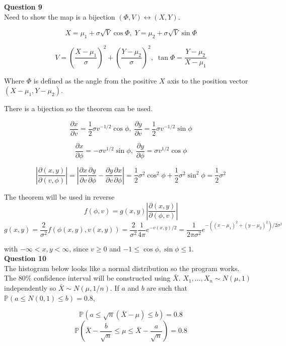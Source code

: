 \documentclass[12pt]{extarticle}
\begin{document}
\textbf{Question 9}\\

Need to show the map is a bijection $(\Phi, V) \leftrightarrow (X,Y)$.

$$X = \mu_1 + \sigma \sqrt{V}\cos{\Phi},\;Y = \mu_2 + \sigma \sqrt{V}\sin{\Phi}$$

$$V = \left(\frac{X-\mu_1}{\sigma}\right)^2+\left(\frac{Y-\mu_2}{\sigma}\right)^2,\;\tan{\Phi} = \frac{Y-\mu_2}{X-\mu_1}$$

Where $\Phi$ is defined as the angle from the positive $X$ axis to the position vector $(X-\mu_1,Y-\mu_2)$. 

There is a bijection so the theorem can be used.

$$\frac{\partial{x}}{\partial{v}} = \frac{1}{2}\sigma v^{-1/2}\cos{\phi} ,\; \frac{\partial{y}}{\partial{v}} = \frac{1}{2}\sigma v^{-1/2}\sin{\phi}$$ 

$$\frac{\partial{x}}{\partial{\phi}} = -\sigma v^{1/2}\sin{\phi},\;\frac{\partial{y}}{\partial{\phi}} =\sigma v^{1/2}\cos{\phi}$$

$$\left|\frac{\partial(x,y)}{\partial(v,\phi)}\right| =
\left|\frac{\partial{x}}{\partial{v}}\frac{\partial{y}}{\partial{\phi}}-\frac{\partial{y}}{\partial{v}}\frac{\partial{x}}{\partial{\phi}}\right| = 
\frac{1}{2}\sigma^2\cos^2{\phi} + \frac{1}{2}\sigma^2\sin^2{\phi} = \frac{1}{2}\sigma^2
$$

The theorem will be used in reverse
$$f(\phi,v) = g(x,y)\left|\frac{\partial(x,y)}{\partial(\phi,v)}\right|$$
$$g(x,y) = \frac{2}{\sigma^2}f(\phi(x,y), v(x,y)) = \frac{2}{\sigma^2}\frac{1}{4\pi}e^{-v(x,y)/2} = \frac{1}{2\pi\sigma^2}e^{-((x-\mu_1)^2+(y-\mu_2)^2)/2\sigma^2}$$

with $-\infty < x,y < \infty$, since $v \geq 0$ and $-1\leq \cos{\phi}, \sin{\phi} \leq 1$.\\

\textbf{Question 10}\\

The histogram below looks like a normal distribution so the program works.\\

The 80\% confidence interval will be constructed using $\bar{X}$. $X_1, \ldots, X_n \sim N(\mu, 1)$ independently so $\bar{X} \sim N(\mu, 1/n)$. If $a$ and $b$ are such that $\mathbb{P}(a \leq N(0,1) \leq b) = 0.8$,

$$\mathbb{P}(a \leq \sqrt{n}(\bar{X}-\mu) \leq b) = 0.8$$
$$\mathbb{P}(\bar{X}-\frac{b}{\sqrt{n}} \leq \mu \leq \bar{X}-\frac{a}{\sqrt{n}}) = 0.8$$
\end{document}
